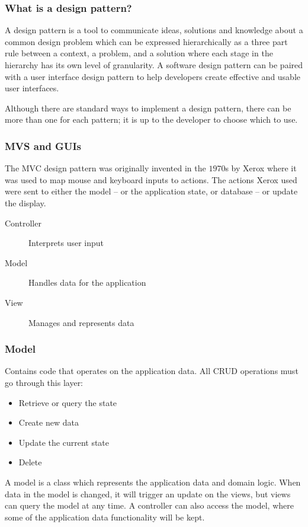 \subsubsection{What is a design pattern?}\label{ssub:what_is_a_design_pattern_}

A design pattern is a tool to communicate ideas, solutions and knowledge about a common design problem which can be expressed hierarchically as a three part rule between a context, a problem, and a solution where each stage in the hierarchy has its own level of granularity.
A software design pattern can be paired with a user interface design pattern to help developers create effective and usable user interfaces.

\begin{note}
	Although there are standard ways to implement a design pattern, there can be more than one for each pattern; it is up to the developer to choose which to use.
\end{note}

\subsubsection{MVS and GUIs}\label{ssub:mvs_and_guis}

The MVC design pattern was originally invented in the \(1970\)s by Xerox where it was used to map mouse and keyboard inputs to actions.
The actions Xerox used were sent to either the model -- or the application state, or database -- or update the display.

\begin{description}
	\item[Controller] Interprets user input
	\item[Model] Handles data for the application
	\item[View] Manages and represents data
\end{description}

\subsubsection{Model}\label{ssub:model}

Contains code that operates on the application data.
All CRUD operations must go through this layer:
\begin{itemize}
	\item Retrieve or query the state
	\item Create new data
	\item Update the current state
	\item Delete
\end{itemize}
A model is a class which represents the application data and domain logic.
When data in the model is changed, it will trigger an update on the views, but views can query the model at any time.
A controller can also access the model, where some of the application data functionality will be kept.

